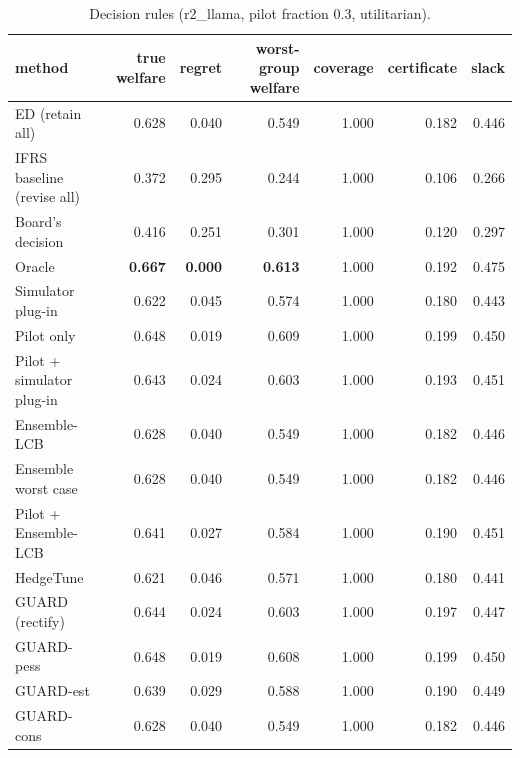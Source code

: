 \begin{table}[t]
\centering
\small
\begin{tabular}{lrrrrrr}
\toprule
method & true welfare & regret & worst-group welfare & coverage & certificate & slack \\
\midrule
ED (retain all) & 0.628 & 0.040 & 0.549 & 1.000 & 0.182 & 0.446 \\
IFRS baseline (revise all) & 0.372 & 0.295 & 0.244 & 1.000 & 0.106 & 0.266 \\
Board's decision & 0.416 & 0.251 & 0.301 & 1.000 & 0.120 & 0.297 \\
Oracle & \textbf{0.667} & \textbf{0.000} & \textbf{0.613} & 1.000 & 0.192 & 0.475 \\
Simulator plug-in & 0.622 & 0.045 & 0.574 & 1.000 & 0.180 & 0.443 \\
Pilot only & 0.648 & 0.019 & 0.609 & 1.000 & 0.199 & 0.450 \\
Pilot + simulator plug-in & 0.643 & 0.024 & 0.603 & 1.000 & 0.193 & 0.451 \\
Ensemble-LCB & 0.628 & 0.040 & 0.549 & 1.000 & 0.182 & 0.446 \\
Ensemble worst case & 0.628 & 0.040 & 0.549 & 1.000 & 0.182 & 0.446 \\
Pilot + Ensemble-LCB & 0.641 & 0.027 & 0.584 & 1.000 & 0.190 & 0.451 \\
HedgeTune & 0.621 & 0.046 & 0.571 & 1.000 & 0.180 & 0.441 \\
GUARD (rectify) & 0.644 & 0.024 & 0.603 & 1.000 & 0.197 & 0.447 \\
GUARD-pess & 0.648 & 0.019 & 0.608 & 1.000 & 0.199 & 0.450 \\
GUARD-est & 0.639 & 0.029 & 0.588 & 1.000 & 0.190 & 0.449 \\
GUARD-cons & 0.628 & 0.040 & 0.549 & 1.000 & 0.182 & 0.446 \\
\bottomrule
\end{tabular}
\caption{Decision rules (r2\_llama, pilot fraction 0.3, utilitarian).}
\label{tab:methods-utilitarian}
\end{table}
